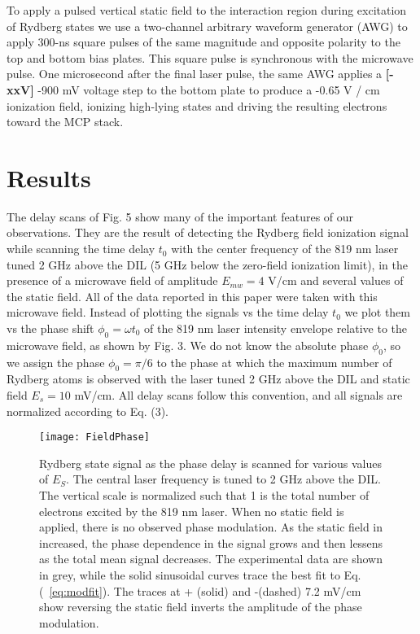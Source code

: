 \documentclass[aps,pra,preprint,groupedaddress]{revtex4-1}
\begin{document}
To apply a pulsed vertical static field to the interaction region during excitation of Rydberg states we use a two-channel arbitrary waveform generator (AWG) to apply 300-ns square pulses of the same magnitude and opposite polarity to the top and bottom bias plates. This square pulse is synchronous with the microwave pulse. One microsecond after the final laser pulse, the same AWG applies a \textbf{[-xxV]} -900 mV voltage step to the bottom plate to produce a -0.65 V / cm ionization field, ionizing high-lying states and driving the resulting electrons toward the MCP stack.


\section{\label{results} Results}


The delay scans of Fig. 5 show many of the important features of our observations. They are the result of detecting the Rydberg field ionization signal while scanning the time delay $t_0$ with the center frequency of the 819 nm laser tuned 2 GHz above the DIL (5 GHz below the zero-field ionization limit), in the presence of a microwave field of amplitude $E_{mw}=4$ V/cm and several values of the static field. All of the data reported in this paper were taken with this microwave field. Instead of plotting the signals vs the time delay $t_0$ we plot them vs the phase shift $\phi_0=\omega t_0$ of the 819 nm laser intensity envelope relative to the microwave field, as shown by Fig. 3. We do not know the absolute phase $\phi_0$, so we assign the phase $\phi_0=\pi/6$ to the phase at which the maximum number of Rydberg atoms is observed with the laser tuned 2 GHz above the DIL and static field $E_s=10$ mV/cm. All delay scans follow this convention, and all signals are normalized according to Eq. (3).


\begin{figure}
	\texttt{[image: FieldPhase]}
	\caption{Rydberg state signal as the phase delay is scanned for various values of $E_S$. The central laser frequency is tuned to 2 GHz above the DIL. The vertical scale is normalized such that 1 is the total number of electrons excited by the 819 nm laser. When no static field is applied, there is no observed phase modulation. As the static field in increased, the phase dependence in the signal grows and then lessens as the total mean signal decreases. The experimental data are shown in grey, while the solid sinusoidal curves trace the best fit to Eq. (~\ref{eq:modfit}). The traces at + (solid) and -(dashed) 7.2 mV/cm show reversing the static field inverts the amplitude of the phase modulation.}
	\label{fig:fph}
\end{figure}
\end{document}
